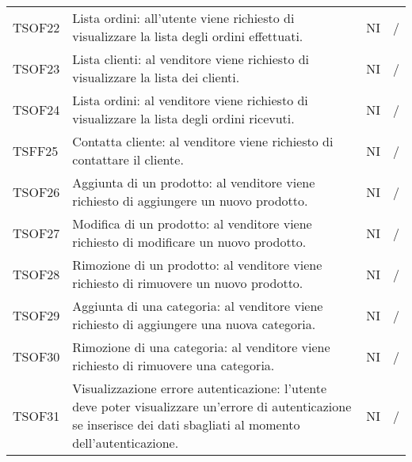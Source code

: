 \begin{center}
\begin{longtable}[!h]{p{60px} p{240px} p{35px} p{35px}}
        TSOF22                           & Lista ordini: all'utente viene richiesto di visualizzare la lista degli ordini effettuati.                                                                          & NI             & /             \\
        TSOF23                           & Lista clienti: al venditore viene richiesto di visualizzare la lista dei clienti.                                                                                   & NI             & /             \\
        TSOF24                           & Lista ordini: al venditore viene richiesto di visualizzare la lista degli ordini ricevuti.                                                                          & NI             & /             \\
        TSFF25                           & Contatta cliente: al venditore viene richiesto di contattare il cliente.                                                                                            & NI             & /             \\
        TSOF26                           & Aggiunta di un prodotto: al venditore viene richiesto di aggiungere un nuovo prodotto.                                                                              & NI             & /             \\
        TSOF27                           & Modifica di un prodotto: al venditore viene richiesto di modificare un nuovo prodotto.                                                                              & NI             & /             \\
        TSOF28                           & Rimozione di un prodotto: al venditore viene richiesto di rimuovere un nuovo prodotto.                                                                              & NI             & /             \\
        TSOF29                           & Aggiunta di una categoria: al venditore viene richiesto di aggiungere una nuova categoria.                                                                          & NI             & /             \\
        TSOF30                           & Rimozione di una categoria: al venditore viene richiesto di rimuovere una categoria.                                                                                & NI             & /             \\
        TSOF31                           & Visualizzazione errore autenticazione: l'utente deve poter visualizzare un'errore di autenticazione se inserisce dei dati sbagliati al momento dell'autenticazione. & NI             & /             \\

\end{longtable}
\end{center}
